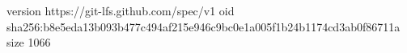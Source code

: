 version https://git-lfs.github.com/spec/v1
oid sha256:b8e5eda13b093b477c494af215e946c9bc0e1a005f1b24b1174cd3ab0f86711a
size 1066
